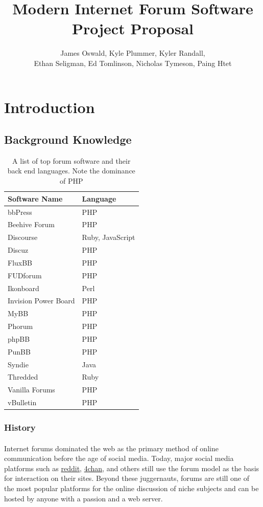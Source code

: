 \documentclass[]{article}
\title{Modern Internet Forum Software \\ Project Proposal}
\author{James Oswald, Kyle Plummer, Kyler Randall, \\ Ethan Seligman, Ed Tomlinson, Nicholas Tymeson, Paing Htet}
\date{}
\begin{document}
\maketitle
\thispagestyle{fancy}

\section{Introduction}
\subsection{Background Knowledge}

\begin{table}
\begin{tabular}{|l|l|}

\hline
\textbf{Software Name} & \textbf{Language} \\
\hline
bbPress & PHP \\
Beehive Forum & PHP \\
Discourse & Ruby, JavaScript \\
Discuz & PHP \\
FluxBB & PHP \\
FUDforum & PHP \\
Ikonboard & Perl \\
Invision Power Board & PHP \\
MyBB & PHP \\
Phorum & PHP \\
phpBB & PHP \\
PunBB & PHP \\
Syndie & Java \\
Thredded & Ruby \\
Vanilla Forums & PHP \\
vBulletin & PHP \\
\hline
\end{tabular}
\captionsetup{belowskip=0pt}
\caption{A list of top forum software and their back end languages. Note the dominance of PHP}
\end{table}
\subsubsection{History}
\paragraph{}
Internet forums dominated the web as the primary method of online communication before the age of social media. Today, major social media platforms such as \href{https://www.reddit.com/}{reddit}, \href{https://www.4channel.org/}{4chan}, and others still use the forum model as the basis for interaction on their sites. Beyond these juggernauts, forums are still one of the most popular platforms for the online discussion of niche subjects and can be hosted by anyone with a passion and a web server. 
\end{document}
